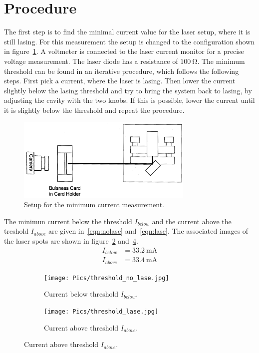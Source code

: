 \vspace{-20pt}
\section{Procedure}
\label{sec:Procedure}

The first step is to find the minimal current value for the laser setup, where
it is still lasing. For this measurement the setup is changed to the configuration shown in
figure~\ref{fig:setup_current}. A voltmeter is connected to the laser current
monitor for a precise voltage measurement. The laser diode has a resistance
of $\SI{100}{\ohm}$.
The minimum threshold can be found in an iterative procedure, which follows the following
steps. First pick a current, where the laser is lasing.
Then lower the current slightly below the lasing threshold and try to bring the system back to lasing,
by adjusting the cavity with the two knobs.
If this is possible, lower the current
until it is slightly below the threshold and repeat the procedure.

\begin{figure}
  \vspace{-10pt}
  \centering
  \includegraphics[width=0.75\textwidth]{Pics/setup_threshold.png}
  \caption{Setup for the minimum current measurement.\cite{anleitung}}
  \label{fig:setup_current}
\end{figure}

The minimun current below the threshold $I_{below}$ and the current above the treshold $I_{above}$
are given in~\eqref{eqn:nolase} and~\eqref{eqn:lase}.
The associated images of the laser spots are shown in figure~\ref{fig:no_lase}
and~\ref{fig:lase}.
\vspace{-10pt}
\begin{align}
  \label{eqn:nolase}
  I_{below} &= \SI{33.2}{\milli\ampere}\\
  \label{eqn:lase}
  I_{above} &= \SI{33.4}{\milli\ampere}
\end{align}

\begin{figure}[h!]
  \centering
  \begin{subfigure}{0.48\textwidth}
    \centering
    \texttt{[image: Pics/threshold\_no\_lase.jpg]}
    \caption{Current below threshold $I_{below}$.}
    \label{fig:no_lase}
  \end{subfigure}
  \begin{subfigure}{0.48\textwidth}
    \centering
    \texttt{[image: Pics/threshold\_lase.jpg]}
    \caption{Current above threshold $I_{above}$.}
    \label{fig:lase}
  \end{subfigure}
\end{figure}
\FloatBarrier

